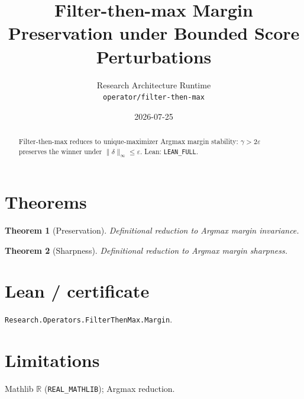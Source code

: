 \documentclass[11pt]{article}
\title{Filter-then-max Margin Preservation under Bounded Score Perturbations}
\author{Research Architecture Runtime \\ \texttt{operator/filter-then-max}}
\date{2026-07-25}
\newtheorem{theorem}{Theorem}
\begin{document}
\maketitle
\begin{abstract}
Filter-then-max reduces to unique-maximizer Argmax margin stability: $\gamma>2\varepsilon$
preserves the winner under $\|\delta\|_\infty\le\varepsilon$. Lean: \texttt{LEAN\_FULL}.
\end{abstract}
\section{Theorems}
\begin{theorem}[Preservation]
Definitional reduction to Argmax margin invariance.
\end{theorem}
\begin{theorem}[Sharpness]
Definitional reduction to Argmax margin sharpness.
\end{theorem}
\section{Lean / certificate}
\texttt{Research.Operators.FilterThenMax.Margin}.
\section{Limitations}
Mathlib $\mathbb{R}$ (\texttt{REAL\_MATHLIB}); Argmax reduction.
\end{document}
